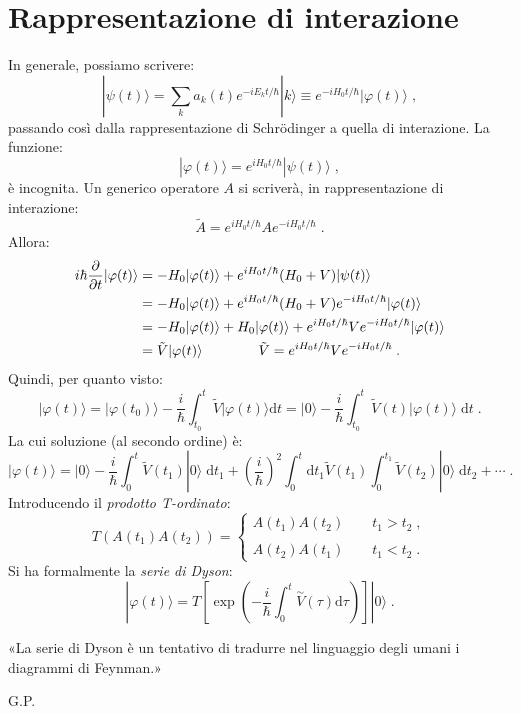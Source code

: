 \documentclass[10pt,a4paper]{report}
\theoremstyle{definition}
\numberwithin{equation}{section}
\newcommand{\diff}[1][]{\mathrm{d}#1}
\newcommand{\ket}{\rangle}
\newcommand{\Sch}{Schrödinger}
\begin{document}
\section{Rappresentazione di interazione}
In generale, possiamo scrivere:
\begin{equation}
|\psi(t)\ket=\sum_k a_k(t)e^{-iE_kt/\hbar}|k\ket\equiv e^{-iH_0t/\hbar}|\varphi(t)\ket\;,
\end{equation}
passando così dalla rappresentazione di \Sch\; a quella di interazione. La funzione:
\begin{equation}
|\varphi(t)\ket=e^{iH_0t/\hbar}|\psi(t)\ket\;,
\end{equation}
è incognita. Un generico operatore $A$ si scriverà, in rappresentazione di interazione:
\begin{equation}
\tilde{A}=e^{iH_0t/\hbar}Ae^{-iH_0t/\hbar}\;.
\end{equation}
Allora:
\begin{align}
i\hbar\frac{\partial}{\partial t}|\varphi(t)\ket &= -H_0|\varphi(t)\ket+e^{iH_0t/\hbar}(H_0+V)|\psi(t)\ket \notag \\
&= -H_0|\varphi(t)\ket+e^{iH_0t/\hbar}(H_0+V)e^{-iH_0t/\hbar}|\varphi(t)\ket \notag \\
&= -H_0|\varphi(t)\ket+H_0|\varphi(t)\ket+e^{iH_0t/\hbar}Ve^{-iH_0t/\hbar}|\varphi(t)\ket \notag \\
&= \tilde{V}|\varphi(t)\ket \qquad\qquad \tilde{V}=e^{iH_0t/\hbar}Ve^{-iH_0t/\hbar}\;.
\end{align}
Quindi, per quanto visto:
\begin{equation}
|\varphi(t)\ket=|\varphi(t_0)\ket-\frac{i}{\hbar}\int_{t_0}^t\tilde{V}|\varphi(t)\ket\diff{t}=|0\ket-\frac{i}{\hbar}\int_{t_0}^t\tilde{V}(t)|\varphi(t)\ket\;\diff{t}\;.
\end{equation}
La cui soluzione (al secondo ordine) è:
\begin{equation}
|\varphi(t)\ket=|0\ket-\frac{i}{\hbar}\int_0^t\tilde{V}(t_1)|0\ket\;\diff{t}_1+\left(\frac{i}{\hbar}\right)^2\int_0^t\diff{t}_1\tilde{V}(t_1)\int_0^{t_1}\tilde{V}(t_2)|0\ket\;\diff{t}_2+\cdots\;.
\end{equation}
Introducendo il \textit{prodotto T-ordinato}:
\begin{equation}
T\left(A(t_1)A(t_2)\right)=\begin{cases}
A(t_1)A(t_2) \qquad t_1>t_2\;, \\
\\
A(t_2)A(t_1) \qquad t_1<t_2\;.
\end{cases}
\end{equation}
Si ha formalmente la \textit{serie di Dyson}:
\begin{equation}
|\varphi(t)\ket=T\left[\exp\left(-\frac{i}{\hbar}\int_0^t\stackrel{\sim}{V}(\tau)\diff{\tau}\right)\right]|0\ket\;.
\end{equation}
\begin{quoting}
«La serie di Dyson è un tentativo di tradurre nel linguaggio degli umani i diagrammi di Feynman.»
\end{quoting}
\begin{flushright}
G.P.
\end{flushright}
\end{document}
